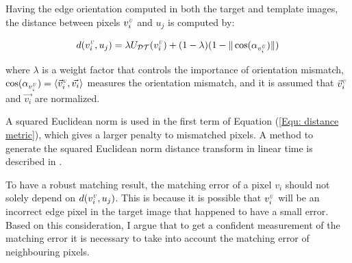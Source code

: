 \documentclass{iitthesis}
\begin{document}
Having the edge orientation computed in both the target and template images, the distance between pixels ${v}_i^{\scalebox{.5}{\textit{U}}}$ and $u_j$ is computed by:

\begin{equation}
d(v_i^{\scalebox{.5}{\textit{U}}}, u_j)=\lambda U_{\mathcal{DT}}(v_i^{\scalebox{.5}{\textit{U}}}) + (1-\lambda)(1- \|\cos(\alpha_{v_i^{\scalebox{.5}{\textit{U}}}})\|)
\label{Equ: distance metric}
\end{equation}

where $\lambda$ is a weight factor that controls the importance of orientation mismatch, $\cos(\alpha_{v_i^{\scalebox{.5}{\textit{U}}}})=\langle{\vec{v}_i^{\scalebox{.5}{\textit{U}}}}, \vec{v_i} \rangle$ measures the orientation mismatch, and it is assumed that $\vec{v}_i^{\scalebox{.5}{\textit{U}}}$ and $\vec{v_i}$ are normalized.

A squared Euclidean norm is used in the first term of Equation (\ref{Equ: distance metric}), which gives a larger penalty to mismatched pixels. A method to generate the squared Euclidean norm distance transform in linear time is described in \cite{PF:04}.

 To have a robust matching result, the matching error of a pixel $v_i$ should not solely depend on $d(v_i^{\scalebox{.5}{\textit{U}}}, u_j)$. This is because it is possible that $v_i^{\scalebox{.5}{\textit{U}}}$ will be an incorrect edge pixel in the target image that happened to have a small error. Based on this consideration, I argue that to get a confident measurement of the matching error it is necessary to take into account the matching error of neighbouring pixels.
\end{document}
